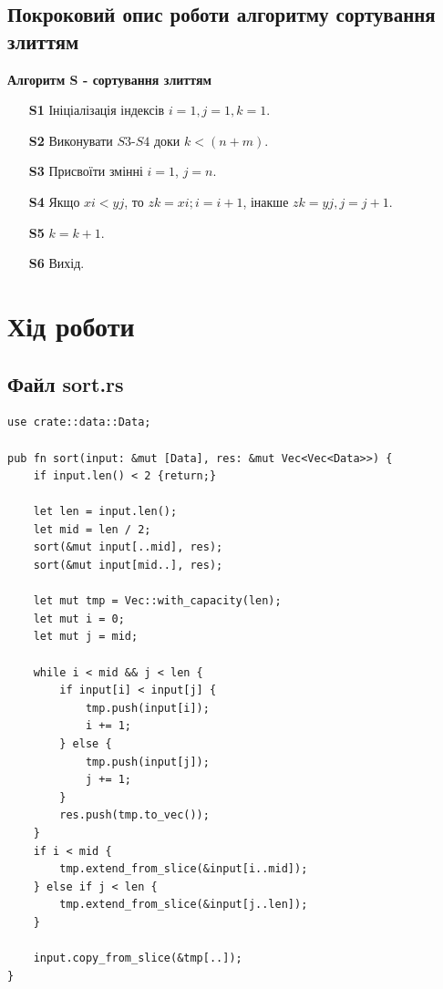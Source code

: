 \documentclass{article}
\begin{document}
\begin{normalsize}
		\subsection*{Покроковий опис роботи алгоритму сортування злиттям}
		\textbf{Алгоритм S - сортування злиттям}
		\begin{enumerate}  
			\item [\textbf{S1}] Ініціалізація індексів $i=1, j=1, k=1$.
			\item [\textbf{S2}] Виконувати $S3$-$S4$ доки $k<(n+m)$.
			\item [\textbf{S3}] Присвоїти змінні $i=1$, $j=n$.
			\item [\textbf{S4}] Якщо $xi  < yj$, то $zk = xi; i=i+1$, інакше $zk=yj, j=j+1$.
			\item [\textbf{S5}] $k=k+1$.
			\item [\textbf{S6}] Вихід.
		\end{enumerate}
		
		\newpage
		
		\section*{Хід роботи}
		\subsection*{Файл sort.rs}
		\begin{lstlisting}
use crate::data::Data;

pub fn sort(input: &mut [Data], res: &mut Vec<Vec<Data>>) {
	if input.len() < 2 {return;}
	
	let len = input.len();
	let mid = len / 2;
	sort(&mut input[..mid], res);
	sort(&mut input[mid..], res);
	
	let mut tmp = Vec::with_capacity(len);
	let mut i = 0;
	let mut j = mid;
	
	while i < mid && j < len {
		if input[i] < input[j] {
			tmp.push(input[i]);
			i += 1;
		} else {
			tmp.push(input[j]);
			j += 1;
		}
		res.push(tmp.to_vec());
	}
	if i < mid {
		tmp.extend_from_slice(&input[i..mid]);
	} else if j < len {
		tmp.extend_from_slice(&input[j..len]);
	}
	
	input.copy_from_slice(&tmp[..]);
}
\end{lstlisting}
		

\end{normalsize}
\end{document}
